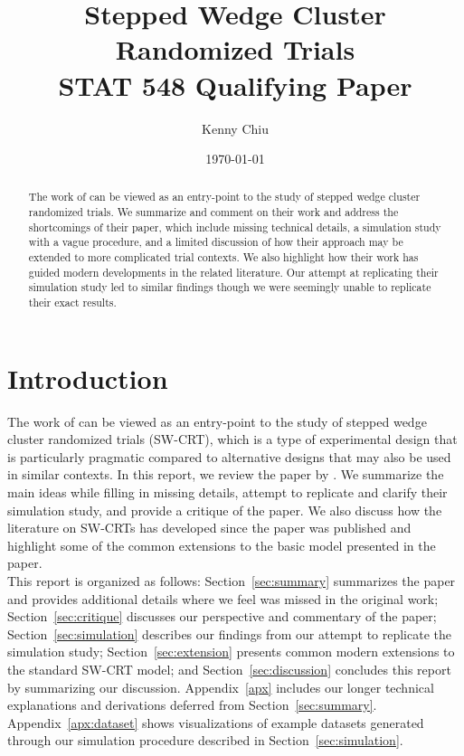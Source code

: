 \documentclass[10pt]{article}
\title{Stepped Wedge Cluster Randomized Trials\\\vspace{0.5em}\large{STAT 548 Qualifying Paper}}
\author{Kenny Chiu}
\date{\today}
\begin{document}
\maketitle

\vspace{2em}

\begin{abstract}
The work of \textcite{Hussey:2007} can be viewed as an entry-point to the study of stepped wedge cluster randomized trials. We summarize and comment on their work and address the shortcomings of their paper, which include missing technical details, a simulation study with a vague procedure, and a limited discussion of how their approach may be extended to more complicated trial contexts. We also highlight how their work has guided modern developments in the related literature. Our attempt at replicating their simulation study led to similar findings though we were seemingly unable to replicate their exact results.
\end{abstract}

\vspace{2em}


\section{Introduction}

The work of \textcite{Hussey:2007} can be viewed as an entry-point to the study of stepped wedge cluster randomized trials (SW-CRT), which is a type of experimental design that is particularly pragmatic compared to alternative designs that may also be used in similar contexts. In this report, we review the paper by \citeauthor{Hussey:2007}. We summarize the main ideas while filling in missing details, attempt to replicate and clarify their simulation study, and provide a critique of the paper. We also discuss how the literature on SW-CRTs has developed since the paper was published and highlight some of the common extensions to the basic model presented in the paper.
\\

This report is organized as follows: Section~\ref{sec:summary} summarizes the paper and provides additional details where we feel was missed in the original work; Section~\ref{sec:critique} discusses our perspective and commentary of the paper; Section~\ref{sec:simulation} describes our findings from our attempt to replicate the simulation study; Section~\ref{sec:extension} presents common modern extensions to the standard SW-CRT model; and Section~\ref{sec:discussion} concludes this report by summarizing our discussion. Appendix~\ref{apx} includes our longer technical explanations and derivations deferred from Section~\ref{sec:summary}. Appendix~\ref{apx:dataset} shows visualizations of example datasets generated through our simulation procedure described in Section~\ref{sec:simulation}.
\end{document}

